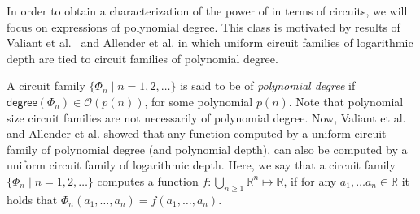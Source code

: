 %

In order to obtain a characterization of the power of \langfor in terms of circuits, we will focus on \langfor expressions of polynomial degree.
This class is motivated by results of Valiant et al.~\cite{valiant1981fast} and Allender et al. \cite{AllenderJMV98} in which uniform circuit families of logarithmic depth are tied to circuit families of polynomial degree.


A circuit family $\{\Phi_n\mid n=1,2,\ldots\}$ is said to be of \textit{polynomial degree} if $\mathsf{degree}(\Phi_n)\in \mathcal O(p(n))$, for some polynomial $p(n)$. Note that polynomial size circuit families are not necessarily of polynomial degree. Now, Valiant et al.~\cite{valiant1981fast} and Allender et al. \cite{AllenderJMV98} showed that any function computed by a uniform circuit family of polynomial degree (and polynomial depth), can also be computed by a uniform circuit family of logarithmic depth. Here, we say that  a circuit family $\{\Phi_n\mid n=1,2,\ldots\}$ computes a function $f:\bigcup_{n\geq 1} \mathbb{R}^n\mapsto\mathbb{R}$, if for any $a_1,\ldots a_n\in \mathbb{R}$ it holds that $\Phi_n(a_1,\ldots ,a_n) = f(a_1,\ldots ,a_n)$. 


